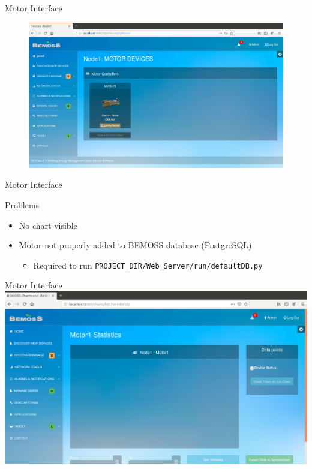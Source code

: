\documentclass{beamer}
\begin{document}
\begin{frame}{Motor Interface}
\begin{figure}
\centering
\includegraphics[scale=0.25]{../figs/motordevices.png}
\end{figure}

\end{frame}

\begin{frame}{Motor Interface}
\begin{block}{Problems}
\begin{itemize}
\item No chart visible
\item Motor not properly added to BEMOSS database (PostgreSQL)
\begin{itemize}
\item Required to run \texttt{PROJECT\_DIR/Web\_Server/run/defaultDB.py}
\end{itemize}
\end{itemize}
\end{block}
\end{frame}

\begin{frame}{Motor Interface}
\includegraphics[scale=0.25]{../figs/nomotorchart.png}
\end{frame}
\end{document}
